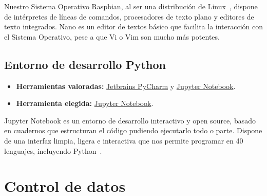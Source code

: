 Nuestro Sistema Operativo Raspbian\cite{misc:RbPWeb}, al ser una distribución de Linux~\cite{misc:Linux}, dispone de intérpretes de líneas de comandos, procesadores de texto plano y editores de texto integrados. Nano es un editor de textos básico que facilita la interacción con el Sistema Operativo, pese a que Vi o Vim son mucho más potentes.

\subsection{Entorno de desarrollo Python}\label{4:Python}
\begin{itemize}
    \item \textbf{Herramientas valoradas:} \href{https://www.jetbrains.com/es-es/pycharm/}{Jetbrains PyCharm} y \href{https://jupyter.org/}{Jupyter Notebook}.
    \item \textbf{Herramienta elegida:} \href{https://jupyter.org/}{Jupyter Notebook}.
\end{itemize}

Jupyter Notebook es un entorno de desarrollo interactivo y open source, basado en cuadernos que estructuran el código pudiendo ejecutarlo todo o parte. Dispone de una interfaz limpia, ligera e interactiva que nos permite programar en 40 lenguajes, incluyendo Python~\cite{misc:Python}.

\section{Control de datos}
